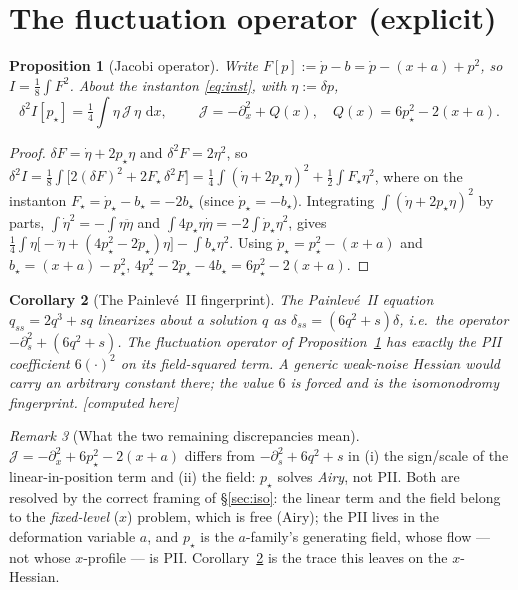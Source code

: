 \documentclass[11pt,reqno]{amsart}
\theoremstyle{plain}
\newtheorem{proposition}{Proposition}
\newtheorem{corollary}[proposition]{Corollary}
\theoremstyle{remark}
\newtheorem{remark}[proposition]{Remark}
\newcommand{\dd}{\,\mathrm{d}}
\newcommand{\pinst}{p_\star}
\newcommand{\OK}{{\footnotesize\textsf{[computed here]}}}
\begin{document}
\section{The fluctuation operator (explicit)}\label{sec:jacobi}

\begin{proposition}[Jacobi operator]\label{prop:jacobi}
Write $F[p]:=\dot p-b=\dot p-(x+a)+p^2$, so $I=\tfrac18\int F^2$. About the instanton
\eqref{eq:inst}, with $\eta:=\delta p$,
\[
\delta^2 I[\pinst]=\tfrac14\!\int \eta\,\mathcal J\,\eta\,\dd x,\qquad
\boxed{\ \mathcal J=-\partial_x^2+Q(x),\quad Q(x)=6\pinst^2-2(x+a).\ }
\]
\end{proposition}

\begin{proof}
$\delta F=\dot\eta+2\pinst\eta$ and $\delta^2F=2\eta^2$, so
$\delta^2 I=\tfrac18\int\!\bigl[2(\delta F)^2+2F_\star\,\delta^2F\bigr]
=\tfrac14\!\int(\dot\eta+2\pinst\eta)^2+\tfrac12\!\int F_\star\eta^2$,
where on the instanton $F_\star=\dot\pinst-b_\star=-2b_\star$ (since $\dot\pinst=-b_\star$).
Integrating $\int(\dot\eta+2\pinst\eta)^2$ by parts,
$\int\dot\eta^2=-\int\eta\ddot\eta$ and $\int4\pinst\eta\dot\eta=-2\int\dot\pinst\eta^2$, gives
$\tfrac14\int\eta\bigl[-\ddot\eta+(4\pinst^2-2\dot\pinst)\eta\bigr]-\int b_\star\eta^2$. Using
$\dot\pinst=\pinst^2-(x+a)$ and $b_\star=(x+a)-\pinst^2$,
$4\pinst^2-2\dot\pinst-4b_\star=6\pinst^2-2(x+a)$. \qedhere
\end{proof}

\begin{corollary}[The Painlev\'e~II fingerprint]\label{cor:fingerprint}
The Painlev\'e~II equation $q_{ss}=2q^3+sq$ linearizes about a solution $q$ as
$\delta_{ss}=(6q^2+s)\delta$, i.e.\ the operator $-\partial_s^2+(6q^2+s)$. The fluctuation operator
of Proposition~\ref{prop:jacobi} has \emph{exactly} the PII coefficient $6(\cdot)^2$ on its
field-squared term. A generic weak-noise Hessian would carry an arbitrary constant there; the value
$6$ is forced and is the isomonodromy fingerprint. \OK
\end{corollary}

\begin{remark}[What the two remaining discrepancies mean]\label{rem:disc}
$\mathcal J=-\partial_x^2+6\pinst^2-2(x+a)$ differs from $-\partial_s^2+6q^2+s$ in (i) the sign/scale
of the linear-in-position term and (ii) the field: $\pinst$ solves \emph{Airy}, not PII. Both are
resolved by the correct framing of \S\ref{sec:iso}: the linear term and the field belong to the
\emph{fixed-level} ($x$) problem, which is free (Airy); the PII lives in the deformation variable
$a$, and $\pinst$ is the $a$-family's generating field, whose flow --- not whose $x$-profile --- is
PII. Corollary~\ref{cor:fingerprint} is the trace this leaves on the $x$-Hessian.
\end{remark}
\end{document}
